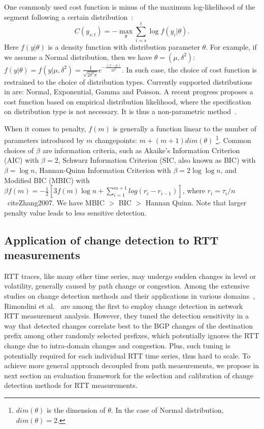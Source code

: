 One commonly used cost function is minus of the maximum log-likelihood of the segment following a certain distribution~\cite{Killick2011,Horvath1993,Chen2001}:
\begin{equation}
C(y_{s:t}) = - \max_\theta \sum_{i=s}^t \log f(y_i|\theta).
\end{equation}
Here $f(y|\theta)$ is a density function with distribution parameter $\theta$. 
For example, if we assume a Normal distribution, then we have $\theta = (\mu, \delta^2)$:
$f(y|\theta) = f(y|\mu, \delta^2) = \frac{1}{\sqrt{2\delta^2\pi}} e^{-\frac{(x-\mu)}{2\delta^2}}$.
In such case, the choice of cost function is restrained to the choice of distribution types.
Currently supported distributions in \cite{Killick2013a} are: Normal, Exponential, Gamma and Poisson.
A recent progress proposes a cost function based on empirical distribution likelihood, where the specification on distribution type is not necessary. It is thus a non-parametric method~\cite{Haynes2016}. 

When it comes to penalty, $f(m)$ is generally a function linear to the number of parameters introduced by $m$ changepoints: 
$m + (m+1)dim(\theta)$ \footnote{$dim(\theta)$ is the dimension of $\theta$. In the case of Normal distribution, $dim(\theta) = 2$.}.
Common choices of $\beta$ are information criteria, such as Akaike’s Information Criterion (AIC) with $\beta=2$, Schwarz Information Criterion (SIC, also known as BIC) with $\beta=\log n$, Hannan-Quinn Information Criterion with $\beta = 2 \log \log n$, and Modified BIC (MBIC) with 
$\beta f(m) = -\frac{1}{2} [3f(m)\log n + \sum_{i=1}^{m+1} log(r_i - r_{i-1})]$, where $r_i = \tau_i/n$~cite{Zhang2007}.
We have MBIC $>$ BIC $>$ Hannan Quinn. Note that larger penalty value leads to less sensitive detection.

\subsection{Application of change detection to RTT measurements}
RTT traces, like many other time series, may undergo sudden changes in level or volatility, generally caused by path change or congestion.
Among the extensive studies on change detection methods and their applications in various domains~\cite{Zhang2007,Reeves2007, Yu2008},
Rimondini et al.~\cite{Rimondini2014} are among the first to employ change detection in network RTT measurement analysis.
However, they tuned the detection sensitivity in a way that detected changes correlate best to the BGP changes of the destination prefix among other randomly selected prefixes, which potentially ignores the RTT change due to intra-domain changes and congestion.
Plus, such tuning is potentially required for each individual RTT time series, thus hard to scale.
To achieve more general approach decoupled from path measurements, we propose in next section an evaluation framework for the selection and calibration of change detection methods for RTT measurements.


